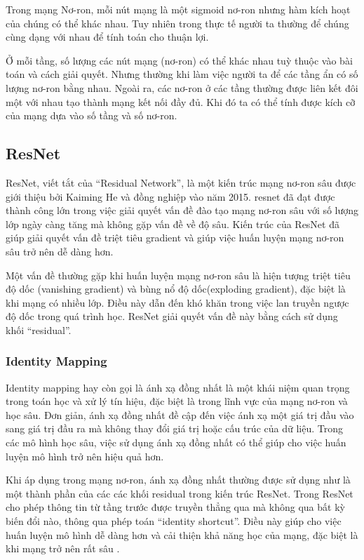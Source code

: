 Trong mạng Nơ-ron, mỗi nút mạng là một sigmoid nơ-ron nhưng hàm kích hoạt của chúng có thể khác nhau. Tuy nhiên trong thực tế người ta thường để chúng cùng dạng với nhau để tính toán cho thuận lợi.

Ở mỗi tầng, số lượng các nút mạng (nơ-ron) có thể khác nhau tuỳ thuộc vào bài toán và cách giải quyết. Nhưng thường khi làm việc người ta để các tầng ẩn có số lượng nơ-ron bằng nhau. Ngoài ra, các nơ-ron ở các tầng thường được liên kết đôi một với nhau tạo thành mạng kết nối đầy đủ. Khi đó ta có thể tính được kích cỡ của mạng dựa vào số tầng và số nơ-ron.

\subsection{ResNet}
ResNet, viết tắt của ``Residual Network'', là một kiến trúc mạng nơ-ron sâu được giới thiệu bởi Kaiming He và đồng nghiệp vào năm 2015. \acrshort*{resnet} đã đạt được thành công lớn trong việc giải quyết vấn đề đào tạo mạng nơ-ron sâu với số lượng lớp ngày càng tăng mà không gặp vấn đề về độ sâu. Kiến trúc của ResNet đã giúp giải quyết vấn đề triệt tiêu gradient và giúp việc huấn luyện mạng nơ-ron sâu trở nên dễ dàng hơn.

Một vấn đề thường gặp khi huấn luyện mạng nơ-ron sâu là hiện tượng triệt tiêu độ dốc (vanishing gradient) và bùng nổ độ dốc(exploding gradient), đặc biệt là khi mạng có nhiều lớp. Điều này dẫn đến khó khăn trong việc lan truyền ngược độ dốc trong quá trình học. ResNet giải quyết vấn đề này bằng cách sử dụng khối ``residual''.

\subsubsection*{Identity Mapping}
Identity mapping hay còn gọi là ánh xạ đồng nhất là một khái niệm quan trọng trong toán học và xử lý tín hiệu, đặc biệt là trong lĩnh vực của mạng nơ-ron và học sâu. Đơn giản, ánh xạ đồng nhất đề cập đến việc ánh xạ một giá trị đầu vào sang giá trị đầu ra mà không thay đổi giá trị hoặc cấu trúc của dữ liệu. Trong các mô hình học sâu, việc sử dụng ánh xạ đồng nhất có thể giúp cho việc huấn luyện mô hình trở nên hiệu quả hơn.

Khi áp dụng trong mạng nơ-ron, ánh xạ đồng nhất thường được sử dụng như là một thành phần của các các khối residual trong kiến trúc ResNet. Trong ResNet cho phép thông tin từ tầng trước được truyền thẳng qua mà không qua bất kỳ biến đổi nào, thông qua phép toán ``identity shortcut''. Điều này giúp cho việc huấn luyện mô hình dễ dàng hơn và cải thiện khả năng học của mạng, đặc biệt là khi mạng trở nên rất sâu \cite{he2016identity}.

